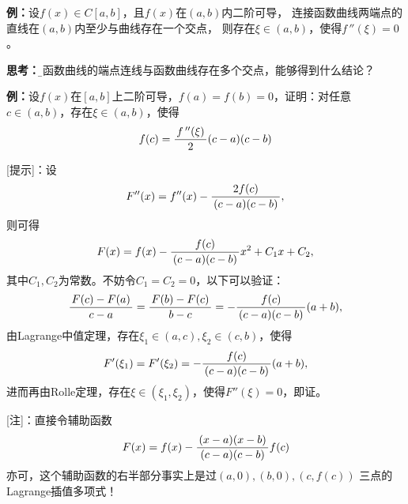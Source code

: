 {\bf 例：}设$f(x)\in C[a,b]$，且$f(x)$在$(a,b)$内二阶可导，
连接函数曲线两端点的直线在$(a,b)$内至少与曲线存在一个交点，
则存在$\xi\in(a,b)$，使得$f\,''(\xi)=0$。

{\bf 思考：}{\b 若函数曲线的端点连线与函数曲线存在多个交点，能够得到什么结论？}

{\bf 例：}设$f(x)$在$[a,b]$上二阶可导，$f(a)=f(b)=0$，证明：对任意
$c\in(a,b)$，存在$\xi\in(a,b)$，使得
$$f(c)=\displaystyle\frac{\,{f\,''(\xi)}\,}{\,{2}\,}(c-a)(c-b)$$

[提示]：设
$$F''(x)=f''(x)-\displaystyle\frac{\,{2f(c)}\,}{\,{(c-a)(c-b)}\,},$$
则可得
$$F(x)=f(x)-\displaystyle\frac{\,{f(c)}\,}{\,{(c-a)(c-b)}\,}x^2+C_1x+C_2,$$
其中$C_1,C_2$为常数。不妨令$C_1=C_2=0$，以下可以验证：
$$\displaystyle\frac{\,{F(c)-F(a)}\,}{\,{c-a}\,}=\displaystyle\frac{\,{F(b)-F(c)}\,}{\,{b-c}\,}
=-\displaystyle\frac{\,{f(c)}\,}{\,{(c-a)(c-b)}\,}(a+b),$$
由Lagrange中值定理，存在$\xi_1\in(a,c),\xi_2\in(c,b)$，使得
$$F'(\xi_1)=F'(\xi_2)=-\displaystyle\frac{\,{f(c)}\,}{\,{(c-a)(c-b)}\,}(a+b),$$
进而再由Rolle定理，存在$\xi\in(\xi_1,\xi_2)$，使得$F''(\xi)=0$，即证。

[注]：直接令辅助函数
$$F(x)=f(x)-\displaystyle\frac{\,{(x-a)(x-b)}\,}{\,{(c-a)(c-b)}\,}f(c)$$
亦可，这个辅助函数的右半部分事实上是过$(a,0),(b,0),(c,f(c))$
三点的{\kaishu Lagrange插值多项式}！

